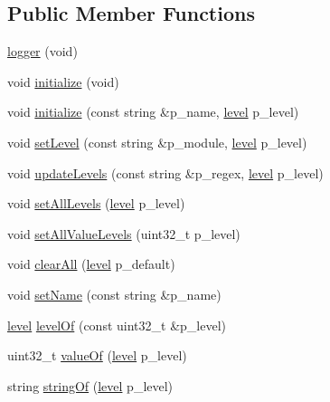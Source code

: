 \subsection*{Public Member Functions}
\begin{DoxyCompactItemize}
\item 
\hyperlink{classxtd_1_1logger_a794da1cd7618a6796d639d11845f9006}{logger} (void)
\item 
void \hyperlink{classxtd_1_1logger_a586ddfe34d0f2c1343385f8034ef9b66}{initialize} (void)
\item 
void \hyperlink{classxtd_1_1logger_a8559c9744e68ecab37076d8744499c8f}{initialize} (const string \&p\-\_\-name, \hyperlink{classxtd_1_1logger_a250ce2f143da181d7149a1556da2a6f1}{level} p\-\_\-level)
\item 
void \hyperlink{classxtd_1_1logger_a9002910ed99cdc1df062c39e385cd379}{set\-Level} (const string \&p\-\_\-module, \hyperlink{classxtd_1_1logger_a250ce2f143da181d7149a1556da2a6f1}{level} p\-\_\-level)
\item 
void \hyperlink{classxtd_1_1logger_af88d4c20247cb62433e660ab7f9f5a97}{update\-Levels} (const string \&p\-\_\-regex, \hyperlink{classxtd_1_1logger_a250ce2f143da181d7149a1556da2a6f1}{level} p\-\_\-level)
\item 
void \hyperlink{classxtd_1_1logger_aeffebbe5b6a43f814c0a1251b6069f26}{set\-All\-Levels} (\hyperlink{classxtd_1_1logger_a250ce2f143da181d7149a1556da2a6f1}{level} p\-\_\-level)
\item 
void \hyperlink{classxtd_1_1logger_a10ec7455d964067fc1ca79f3a7cc14b4}{set\-All\-Value\-Levels} (uint32\-\_\-t p\-\_\-level)
\item 
void \hyperlink{classxtd_1_1logger_a18cd978561fcaf48e2fc935331834fe9}{clear\-All} (\hyperlink{classxtd_1_1logger_a250ce2f143da181d7149a1556da2a6f1}{level} p\-\_\-default)
\item 
void \hyperlink{classxtd_1_1logger_a314e15f9d6eeeafbcf93b2bb757e2143}{set\-Name} (const string \&p\-\_\-name)
\item 
\hyperlink{classxtd_1_1logger_a250ce2f143da181d7149a1556da2a6f1}{level} \hyperlink{classxtd_1_1logger_afa70268de8cc055f4903a54fa61c52df}{level\-Of} (const uint32\-\_\-t \&p\-\_\-level)
\item 
uint32\-\_\-t \hyperlink{classxtd_1_1logger_a615e10d21938ff8681a98894aa31490e}{value\-Of} (\hyperlink{classxtd_1_1logger_a250ce2f143da181d7149a1556da2a6f1}{level} p\-\_\-level)
\item 
string \hyperlink{classxtd_1_1logger_a791f6ccde4fa459cf05085d9b7a0f2d5}{string\-Of} (\hyperlink{classxtd_1_1logger_a250ce2f143da181d7149a1556da2a6f1}{level} p\-\_\-level)

\end{DoxyCompactItemize}
